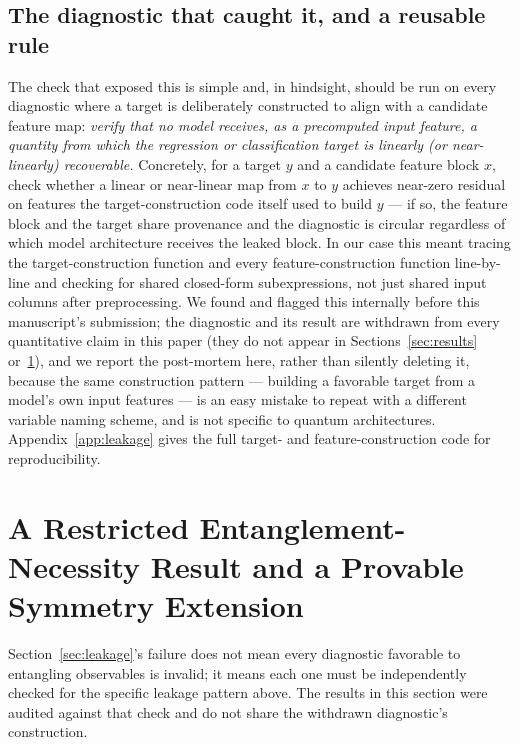 \documentclass[journal]{IEEEtran}
\begin{document}
\subsection{The diagnostic that caught it, and a reusable rule}
The check that exposed this is simple and, in hindsight, should be run on every diagnostic where a target is deliberately constructed to align with a candidate feature map: \emph{verify that no model receives, as a precomputed input feature, a quantity from which the regression or classification target is linearly (or near-linearly) recoverable.} Concretely, for a target $y$ and a candidate feature block $x$, check whether a linear or near-linear map from $x$ to $y$ achieves near-zero residual on features the target-construction code itself used to build $y$ --- if so, the feature block and the target share provenance and the diagnostic is circular regardless of which model architecture receives the leaked block. In our case this meant tracing the target-construction function and every feature-construction function line-by-line and checking for shared closed-form subexpressions, not just shared input columns after preprocessing. We found and flagged this internally before this manuscript's submission; the diagnostic and its result are withdrawn from every quantitative claim in this paper (they do not appear in Sections~\ref{sec:results} or~\ref{sec:symmetry}), and we report the post-mortem here, rather than silently deleting it, because the same construction pattern --- building a favorable target from a model's own input features --- is an easy mistake to repeat with a different variable naming scheme, and is not specific to quantum architectures. Appendix~\ref{app:leakage} gives the full target- and feature-construction code for reproducibility.

\section{A Restricted Entanglement-Necessity Result and a Provable Symmetry Extension}
\label{sec:symmetry}
Section~\ref{sec:leakage}'s failure does not mean every diagnostic favorable to entangling observables is invalid; it means each one must be independently checked for the specific leakage pattern above. The results in this section were audited against that check and do not share the withdrawn diagnostic's construction.
\end{document}
